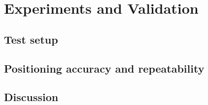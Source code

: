 \chapter{Experiments and Validation}
\label{ch:validation}

\section{Test setup}

\section{Positioning accuracy and repeatability}

\section{Discussion}
